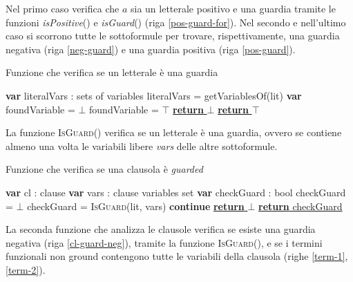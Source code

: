 Nel primo caso verifica che $a$ sia un letterale positivo e una guardia tramite
 le funzioni \emph{isPositive}() e \emph{isGuard}() (riga \ref{pos-guard-for}). 
Nel secondo e nell'ultimo caso si scorrono tutte le sottoformule per trovare, rispettivamente, 
una guardia negativa (riga \ref{neg-guard}) e una guardia positiva (riga \ref{pos-guard}).
\begin{algorithm}
    \caption{Funzione che verifica se un letterale è una guardia}
    \begin{algorithmic}
            \State \textbf{var} literalVars : sets of variables
            \State literalVars = getVariablesOf(lit)
                \State \textbf{var} foundVariable = $\bot$
                        \State foundVariable = $\top$
                    \EndIf
                \EndWhile
                    \State \underline{\textbf{return} $\bot$}
                \EndIf
            \EndFor
            \State \underline{\textbf{return} $\top$}
        \EndFunction
    \end{algorithmic}
\end{algorithm}

La funzione \textsc{IsGuard}() verifica se un letterale è una guardia, ovvero se contiene 
almeno una volta le variabili libere \emph{vars} delle altre sottoformule. 

\begin{algorithm}[H]
    \caption{Funzione che verifica se una clausola è \emph{guarded}}
    \begin{algorithmic}
        \State \textbf{var} cl : clause
        \State \textbf{var} vars : clause variables set
        \State \textbf{var} checkGuard : bool
        \State checkGuard = $\bot$
            \label{cl-guard-neg}
                \State checkGuard = \textsc{IsGuard}(lit, vars)
                    \State \textbf{continue}
                \EndIf
            \EndIf
             \label{term-1}
                 \label{term-2}
                    \State \underline{\textbf{return} $\bot$}
                \EndIf
            \EndFor
        \EndFor
        \State \underline{\textbf{return} checkGuard}
    \end{algorithmic}
\end{algorithm}
La seconda funzione che analizza le clausole verifica se esiste una guardia negativa (riga \ref{cl-guard-neg}), 
tramite la funzione \textsc{IsGuard}(), e se i termini funzionali non ground contengono 
tutte le variabili della clausola (righe \ref{term-1}, \ref{term-2}).



